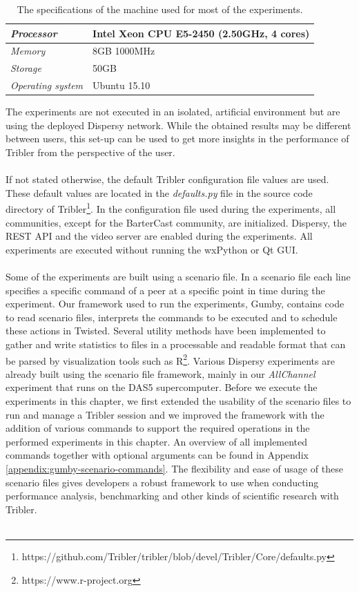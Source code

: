 \begin{table}[h!]
	\centering
	\begin{tabular}{|l|l|}
		\hline
		\emph{Processor} & Intel Xeon CPU E5-2450 (2.50GHz, 4 cores)\\ \hline
		\emph{Memory} & 8GB 1000MHz \\ \hline
		\emph{Storage} & 50GB \\ \hline
		\emph{Operating system} & Ubuntu 15.10 \\ \hline
	\end{tabular}
	\caption{The specifications of the machine used for most of the experiments.}
	\label{table:experiments-server-specifications}
\end{table}

\noindent The experiments are not executed in an isolated, artificial environment but are using the deployed Dispersy network. While the obtained results may be different between users, this set-up can be used to get more insights in the performance of Tribler from the perspective of the user.\\\\
If not stated otherwise, the default Tribler configuration file values are used. These default values are located in the \emph{defaults.py} file in the source code directory of Tribler\footnote{https://github.com/Tribler/tribler/blob/devel/Tribler/Core/defaults.py}. In the configuration file used during the experiments, all communities, except for the BarterCast community, are initialized. Dispersy, the REST API and the video server are enabled during the experiments. All experiments are executed without running the wxPython or Qt GUI.\\\\
Some of the experiments are built using a scenario file. In a scenario file each line specifies a specific command of a peer at a specific point in time during the experiment. Our framework used to run the experiments, Gumby, contains code to read scenario files, interprets the commands to be executed and to schedule these actions in Twisted. Several utility methods have been implemented to gather and write statistics to files in a processable and readable format that can be parsed by visualization tools such as R\footnote{https://www.r-project.org}. Various Dispersy experiments are already built using the scenario file framework, mainly in our \emph{AllChannel} experiment that runs on the DAS5 supercomputer. Before we execute the experiments in this chapter, we first extended the usability of the scenario files to run and manage a Tribler session and we improved the framework with the addition of various commands to support the required operations in the performed experiments in this chapter. An overview of all implemented commands together with optional arguments can be found in Appendix \ref{appendix:gumby-scenario-commands}. The flexibility and ease of usage of these scenario files gives developers a robust framework to use when conducting performance analysis, benchmarking and other kinds of scientific research with Tribler.\\\\
